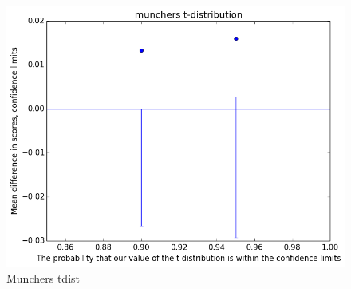 			\begin{figure}[h] 
				\centering 
				\includegraphics[height=0.33\textheight]{munchers_tdist.png} 
				\caption{Munchers tdist}
			\end{figure}

